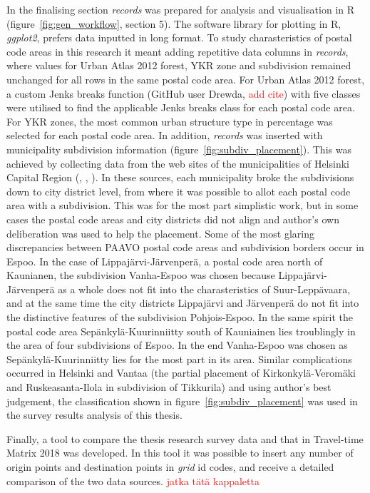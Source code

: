 In the finalising section \textit{records} was prepared for analysis and visualisation in R (figure~\ref{fig:gen_workflow}, section 5).  The software library for plotting in R, \textit{ggplot2}, prefers data inputted in long format. To study charasteristics of postal code areas in this research it meant adding repetitive data columns in \textit{records}, where values for Urban Atlas 2012 forest, YKR zone and subdivision remained unchanged for all rows in the same postal code area. For Urban Atlas 2012 forest, a custom Jenks breaks function (GitHub user Drewda, \textcolor{red}{add cite}) with five classes were utilised to find the applicable Jenks breaks class for each postal code area. For YKR zones, the most common urban structure type in percentage was selected for each postal code area. In addition, \textit{records} was inserted with municipality subdivision information (figure~\ref{fig:subdiv_placement}). This was achieved by collecting data from the web sites of the municipalities of Helsinki Capital Region (\cite{Espoonkaupunki2020}, \cite{Helsinginkaupunkiymparistontoimiala2019}, \cite{Vantaankaupunki2019}). In these sources, each municipality broke the subdivisions down to city district level, from where it was possible to allot each postal code area with a subdivision. This was for the most part simplistic work, but in some cases the postal code areas and city districts did not align and author's own deliberation was used to help the placement. Some of the most glaring discrepancies between PAAVO postal code areas and subdivision borders occur in Espoo. In the case of Lippajärvi-Järvenperä, a postal code area north of Kaunianen, the subdivision Vanha-Espoo was chosen because Lippajärvi-Järvenperä as a whole does not fit into the charasteristics of Suur-Leppävaara, and at the same time the city districts Lippajärvi and Järvenperä do not fit into the distinctive features of the subdivision Pohjois-Espoo. In the same spirit the postal code area Sepänkylä-Kuurinniitty south of Kauniainen lies troublingly in the area of four subdivisions of Espoo. In the end Vanha-Espoo was chosen as Sepänkylä-Kuurinniitty lies for the most part in its area. Similar complications occurred in Helsinki and Vantaa (the partial placement of Kirkonkylä-Veromäki and Ruskeasanta-Ilola in subdivision of Tikkurila) and using author's best judgement, the classification shown in figure~\ref{fig:subdiv_placement} was used in the survey results analysis of this thesis.

Finally, a tool to compare the thesis research survey data and that in Travel-time Matrix 2018 was developed. In this tool it was possible to insert any number of origin points and destination points in \textit{grid} id codes, and receive a detailed comparison of the two data sources. \textcolor{red}{jatka tätä kappaletta}

